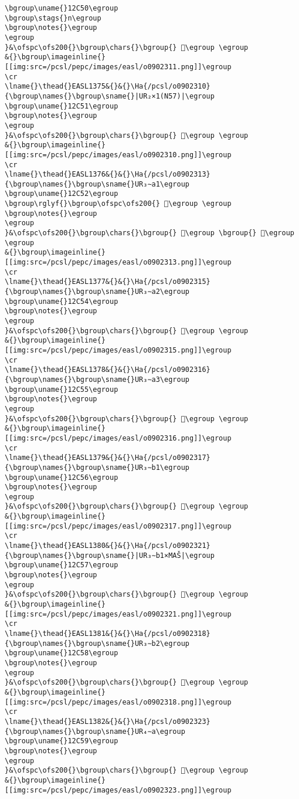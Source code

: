 \begin{verbatim}
\bgroup\uname{}12C50\egroup
\bgroup\stags{}n\egroup
\bgroup\notes{}\egroup
\egroup
}&\ofspc\ofs200{}\bgroup\chars{}\bgroup{} 𒱐\egroup \egroup
&{}\bgroup\imageinline{}[[img:src=/pcsl/pepc/images/easl/o0902311.png]]\egroup
\cr
\lname{}\thead{}EASL1375&{}&{}\Ha{/pcsl/o0902310}{\bgroup\names{}\bgroup\sname{}|UR₂×1(N57)|\egroup
\bgroup\uname{}12C51\egroup
\bgroup\notes{}\egroup
\egroup
}&\ofspc\ofs200{}\bgroup\chars{}\bgroup{} 𒱑\egroup \egroup
&{}\bgroup\imageinline{}[[img:src=/pcsl/pepc/images/easl/o0902310.png]]\egroup
\cr
\lname{}\thead{}EASL1376&{}&{}\Ha{/pcsl/o0902313}{\bgroup\names{}\bgroup\sname{}UR₃∼a1\egroup
\bgroup\uname{}12C52\egroup
\bgroup\rglyf{}\bgroup\ofspc\ofs200{} 𒱒\egroup \egroup
\bgroup\notes{}\egroup
\egroup
}&\ofspc\ofs200{}\bgroup\chars{}\bgroup{} 𒱒\egroup \bgroup{} 𒱓\egroup \egroup
&{}\bgroup\imageinline{}[[img:src=/pcsl/pepc/images/easl/o0902313.png]]\egroup
\cr
\lname{}\thead{}EASL1377&{}&{}\Ha{/pcsl/o0902315}{\bgroup\names{}\bgroup\sname{}UR₃∼a2\egroup
\bgroup\uname{}12C54\egroup
\bgroup\notes{}\egroup
\egroup
}&\ofspc\ofs200{}\bgroup\chars{}\bgroup{} 𒱔\egroup \egroup
&{}\bgroup\imageinline{}[[img:src=/pcsl/pepc/images/easl/o0902315.png]]\egroup
\cr
\lname{}\thead{}EASL1378&{}&{}\Ha{/pcsl/o0902316}{\bgroup\names{}\bgroup\sname{}UR₃∼a3\egroup
\bgroup\uname{}12C55\egroup
\bgroup\notes{}\egroup
\egroup
}&\ofspc\ofs200{}\bgroup\chars{}\bgroup{} 𒱕\egroup \egroup
&{}\bgroup\imageinline{}[[img:src=/pcsl/pepc/images/easl/o0902316.png]]\egroup
\cr
\lname{}\thead{}EASL1379&{}&{}\Ha{/pcsl/o0902317}{\bgroup\names{}\bgroup\sname{}UR₃∼b1\egroup
\bgroup\uname{}12C56\egroup
\bgroup\notes{}\egroup
\egroup
}&\ofspc\ofs200{}\bgroup\chars{}\bgroup{} 𒱖\egroup \egroup
&{}\bgroup\imageinline{}[[img:src=/pcsl/pepc/images/easl/o0902317.png]]\egroup
\cr
\lname{}\thead{}EASL1380&{}&{}\Ha{/pcsl/o0902321}{\bgroup\names{}\bgroup\sname{}|UR₃∼b1×MAŠ|\egroup
\bgroup\uname{}12C57\egroup
\bgroup\notes{}\egroup
\egroup
}&\ofspc\ofs200{}\bgroup\chars{}\bgroup{} 𒱗\egroup \egroup
&{}\bgroup\imageinline{}[[img:src=/pcsl/pepc/images/easl/o0902321.png]]\egroup
\cr
\lname{}\thead{}EASL1381&{}&{}\Ha{/pcsl/o0902318}{\bgroup\names{}\bgroup\sname{}UR₃∼b2\egroup
\bgroup\uname{}12C58\egroup
\bgroup\notes{}\egroup
\egroup
}&\ofspc\ofs200{}\bgroup\chars{}\bgroup{} 𒱘\egroup \egroup
&{}\bgroup\imageinline{}[[img:src=/pcsl/pepc/images/easl/o0902318.png]]\egroup
\cr
\lname{}\thead{}EASL1382&{}&{}\Ha{/pcsl/o0902323}{\bgroup\names{}\bgroup\sname{}UR₄∼a\egroup
\bgroup\uname{}12C59\egroup
\bgroup\notes{}\egroup
\egroup
}&\ofspc\ofs200{}\bgroup\chars{}\bgroup{} 𒱙\egroup \egroup
&{}\bgroup\imageinline{}[[img:src=/pcsl/pepc/images/easl/o0902323.png]]\egroup

\end{verbatim}
